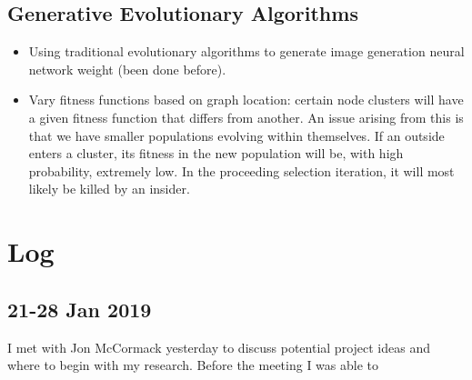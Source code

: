 \documentclass[10pt,a4paper]{article}
\begin{document}
\subsection{Generative Evolutionary Algorithms}
\begin{itemize}
	\item Using traditional evolutionary algorithms to generate image generation neural network weight (been done before).
	\item Vary fitness functions based on graph location: certain node clusters will have a given fitness function that differs from another.
	An issue arising from this is that we have smaller populations evolving within themselves.
	If an outside enters a cluster, its fitness in the new population will be, with high probability, extremely low.
	In the proceeding selection iteration, it will most likely be killed by an insider.
	
\end{itemize}


\pagebreak
\section{Log}

\subsection{21-28 Jan 2019}

I met with Jon McCormack yesterday to discuss potential project ideas and where to begin with my research.
Before the meeting I was able to
\end{document}
